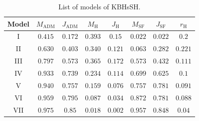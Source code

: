 \documentclass[twocolumn,aps,showpacs,showkeys,prd,superscriptaddress,byrevtex, amsmath]{revtex4-1}
\begin{document}
\begin{table}
\caption{List of models of KBHsSH.}        
\label{models_list}      
\centering          
\begin{tabular}{c c c c  c c c c}
\hline\hline       
 Model & $M_{\mathrm{ADM}}$ & $J_{\mathrm{ADM}}$ & $M_{\mathrm{H}}$ &  $J_{\mathrm{H}}$ & $M_{\mathrm{SF}}$ & $J_{\mathrm{SF}}$ & $r_{\mathrm{H}}$ \\ 
\hline           
I & $0.415$ & $0.172$ & $0.393$ &  $0.15$  & $0.022$ & $0.022$ & $0.2$\\ 
 \hline 
II & $0.630$ & $0.403$ & $0.340$ &  $0.121$  & $0.063$ & $0.282$ & $0.221$ \\
 \hline 
III & $0.797$ & $0.573$ & $0.365$ &  $0.172$  & $0.573$ & $0.432$ & $0.111$ \\ 
 \hline 
IV & $0.933$ & $0.739$ & $0.234$ &  $0.114$  & $0.699$ & $0.625$ & $0.1$ \\ 
 \hline 
V & $0.940$ & $0.757$ & $0.159$ &  $0.076$  & $0.757$ & $0.781$ & $0.091$ \\ 
 \hline 
VI & $0.959$ & $0.795$ & $0.087$ &  $0.034$  & $0.872$ & $0.781$ & $0.088$ \\ 
 \hline 
VII & $0.975$ & $0.85$ & $0.018$ &  $0.002$  & $0.957$ & $0.848$ & $0.04$ \\ 
\hline      
\end{tabular}
\end{table}
\end{document}
